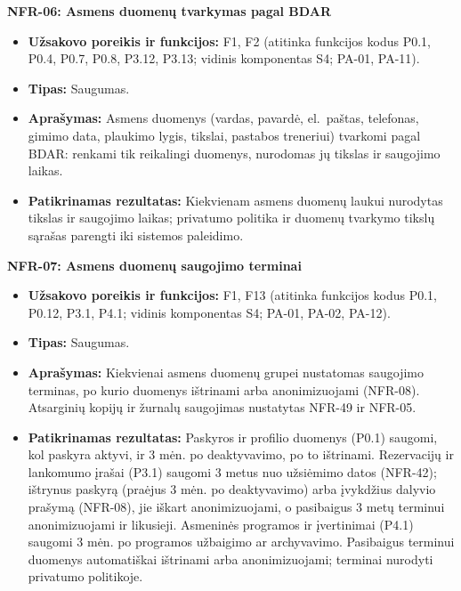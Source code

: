 \noindent\textbf{NFR-06: Asmens duomenų tvarkymas pagal BDAR}
\begin{itemize}
    \item \textbf{Užsakovo poreikis ir funkcijos:} F1, F2 (atitinka funkcijos kodus P0.1, P0.4, P0.7, P0.8, P3.12, P3.13; vidinis komponentas S4; PA-01, PA-11).
    \item \textbf{Tipas:} Saugumas.
    \item \textbf{Aprašymas:} Asmens duomenys (vardas, pavardė, el.~paštas, telefonas, gimimo data, plaukimo lygis, tikslai, pastabos treneriui) tvarkomi pagal BDAR: renkami tik reikalingi duomenys, nurodomas jų tikslas ir saugojimo laikas.
    \item \textbf{Patikrinamas rezultatas:} Kiekvienam asmens duomenų laukui nurodytas tikslas ir saugojimo laikas; privatumo politika ir duomenų tvarkymo tikslų sąrašas parengti iki sistemos paleidimo.
\end{itemize}

\noindent\textbf{NFR-07: Asmens duomenų saugojimo terminai}
\begin{itemize}
    \item \textbf{Užsakovo poreikis ir funkcijos:} F1, F13 (atitinka funkcijos kodus P0.1, P0.12, P3.1, P4.1; vidinis komponentas S4; PA-01, PA-02, PA-12).
    \item \textbf{Tipas:} Saugumas.
    \item \textbf{Aprašymas:} Kiekvienai asmens duomenų grupei nustatomas saugojimo terminas, po kurio duomenys ištrinami arba anonimizuojami (NFR-08). Atsarginių kopijų ir žurnalų saugojimas nustatytas NFR-49 ir NFR-05.
    \item \textbf{Patikrinamas rezultatas:} Paskyros ir profilio duomenys (P0.1) saugomi, kol paskyra aktyvi, ir 3 mėn. po deaktyvavimo, po to ištrinami. Rezervacijų ir lankomumo įrašai (P3.1) saugomi 3 metus nuo užsiėmimo datos (NFR-42); ištrynus paskyrą (praėjus 3 mėn. po deaktyvavimo) arba įvykdžius dalyvio prašymą (NFR-08), jie iškart anonimizuojami, o pasibaigus 3 metų terminui anonimizuojami ir likusieji. Asmeninės programos ir įvertinimai (P4.1) saugomi 3 mėn. po programos užbaigimo ar archyvavimo. Pasibaigus terminui duomenys automatiškai ištrinami arba anonimizuojami; terminai nurodyti privatumo politikoje.
\end{itemize}


